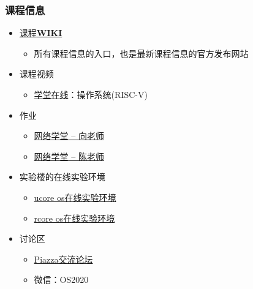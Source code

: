 \begin{frame}
	\frametitle{课程信息}
	\begin{itemize}
		\item \href{http://os.cs.tsinghua.edu.cn/oscourse/OS2020spring}{课程\textbf{WIKI}}
		\begin{itemize}
		\item 所有课程信息的入口，也是最新课程信息的官方发布网站
	    \end{itemize}
		\pause
		\item 课程视频
		\begin{itemize}
    		\item \href{https://next.xuetangx.com/}{学堂在线}：操作系统(RISC-V)
    	\end{itemize}
		\pause
    	\item 作业
    	\begin{itemize}
    	    \item \href{http://learn.tsinghua.edu.cn/f/wlxt/index/course/teacher/course?wlkcid=2019-2020-2140259621}{网络学堂 -- 向老师}		
		    \item \href{http://learn.tsinghua.edu.cn/f/wlxt/index/course/teacher/course?wlkcid=2019-2020-2140259622}{网络学堂 -- 陈老师}
    	\end{itemize}
		\pause
    	\item 实验楼的在线实验环境
    	\begin{itemize}
		    \item \href{https://www.shiyanlou.com/courses/221}{ucore os在线实验环境}
		    \item \href{https://www.shiyanlou.com/courses/1481}{rcore os在线实验环境}
		\end{itemize}
		\item 讨论区
		\begin{itemize}
		    \item \href{https://piazza.com/tsinghua.edu.cn/spring2015/30240243x/home}{Piazza交流论坛}
		    \item 微信：OS2020
		\end{itemize}
	\end{itemize}
\end{frame}



